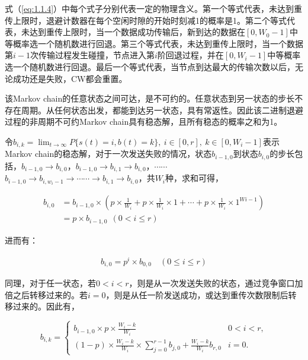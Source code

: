 \documentclass[bwprint]{gmcmthesis}
\begin{document}
式（\ref{eq:1.1.4}）中每个式子分别代表一定的物理含义。第一个等式代表，未达到重传上限时，退避计数器在每个空闲时隙的开始时刻减1的概率是1。第二个等式代表，未达到重传上限时，当一个数据成功传输后，新到达的数据在$[0, W_0-1]$中等概率选一个随机数进行回退。第三个等式代表，未达到重传上限时，当一个数据第$i-1$次传输过程发生碰撞，节点进入第$i$阶回退过程，并在$[0, W_i-1]$中等概率选一个随机数进行回退。最后一个等式代表，当节点到达最大的传输次数以后，无论成功还是失败，CW都会重置。

该Markov chain的任意状态之间可达，是不可约的。任意状态到另一状态的步长不存在周期。从任何状态出发，都能到达另一状态，具有常返性。因此该二进制退避过程的非周期不可约Markov chain具有稳态解，且所有稳态的概率之和为1。

令$b_{i,k} =\displaystyle \lim_{t \to \infty}  
P\{s(t)=i,b(t)=k\}, \ i\in [0,r], \ k\in[0,W_i-1]$表示Markov chain的稳态解，对于一次发送失败的情况，状态$b_{i-1,0}$到状态$b_{i,0}$的步长包括，$b_{i-1,0}\to b_{i,0}$，$b_{i-1,0}\to b_{i,1}\to b_{i,0}$，$\cdots\cdots$ $b_{i-1,0} \to b_{i,w_i-1}\to \cdots\cdots\to b_{i,1}\to b_{i,0} $，共$W_i$种，求和可得，


\begin{equation}
    \begin{aligned}
    b_{i,0}  &= b_{i-1,0} \times  (p \times  \frac{1}{W_i}+p \times  \frac{1}{W_i} \times 1+ \cdots+p\times\frac{1}{W_i}\times1^{Wi-1}) \\
    &= p\times b_{i-1,0}  \ \ (0 <i\le r)
    \label{eq:1.1.5}
    \end{aligned}
\end{equation}

进而有：

\begin{equation}
    \begin{aligned}
    b_{i,0}=p^i\times b_{0,0}  \quad (0\le i \le r)
    \label{eq:1.1.51}
    \end{aligned}
\end{equation}

同理，对于任一状态，若$0 < i < r$，则是从一次发送失败的状态，通过竞争窗口加倍之后转移过来的。若$i = 0$，则是从任一阶发送成功，或达到重传次数限制后转移过来的。因此有，


\begin{equation}
b_{i,k}=\left\{\begin{matrix}
b_{i-1,0}\times p\times \displaystyle \frac{W_i-k}{W_i}   & 0<i<r, \\
(1-p)\times \displaystyle \frac{W_i-k}{W_i}\times  {\displaystyle \sum_{j=0}^{r-1}} b_{j,0}+\displaystyle \frac{W_i-k}{W_i}b_{r,0}     & i=0.
\end{matrix}\right.
    \label{eq:1.1.6}
\end{equation}
\end{document}
